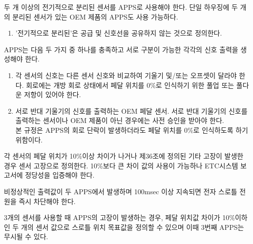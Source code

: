 \documentclass[final,a4paper,10pt]{report}
\begin{document}
\begin{enumerate}
\begin{enumerate}
      \item\label{rule:formula-technical.electronic-throttle-control.apps.two-separated-sensors} 두 개 이상의 전기적으로 분리된 센서를 APPS로 사용해야 한다. 단일 하우징에 두 개의 분리된 센서가 있는 OEM 제품의 APPS도 사용 가능하다.
        \begin{enumerate}
          \item\label{rule:formula-technical.electronic-throttle-control.apps.two-separated-sensors.definition} {\color{blue} '전기적으로 분리된'은 공급 및 신호선을 공유하지 않는 것으로 정의한다.}
        \end{enumerate}

      {\color{blue}
      \item\label{rule:formula-technical.electronic-throttle-control.apps.distinct-signals} APPS는 다음 두 가지 중 하나를 충족하고 서로 구분이 가능한 각각의 신호 출력을 생성해야 한다.
        \begin{enumerate}
          \item\label{rule:formula-technical.electronic-throttle-control.apps.distinct-signals.differing-slope-or-offset} 각 센서의 신호는 다른 센서 신호와 비교하여 기울기 및/또는 오프셋이 달라야 한다. 회로에는 개방 회로 상태에서 페달 위치를 0\%로 인식하기 위한 풀업 또는 풀다운 저항이 있어야 한다.
          \item\label{rule:formula-technical.electronic-throttle-control.apps.distinct-signals.opposite-slope-sensors} 서로 반대 기울기의 신호를 출력하는 OEM 페달 센서. 서로 반대 기울기의 신호를 출력하는 센서이나 OEM 제품이 아닌 경우에는 사전 승인을 받아야 한다. \\
            본 규정은 APPS의 회로 단락이 발생하더라도 페달 위치를 0\%로 인식하도록 하기 위함이다.
        \end{enumerate}

      \item\label{rule:formula-technical.electronic-throttle-control.apps.sensor-failure-10pct-diff} 각 센서의 페달 위치가 10\%이상 차이가 나거나 제36조에 정의된 기타 고장이 발생한 경우 센서 고장으로 정의한다. 10\%보다 큰 차이 값의 사용이 가능하나 ETC시스템 보고서에 정당성을 입증해야 한다.
      \item\label{rule:formula-technical.electronic-throttle-control.apps.shutdown-after-100ms-mismatch} 비정상적인 출력값이 두 APPS에서 발생하며 100msec 이상 지속되면 전자 스로틀 전원을 즉시 차단해야 한다.
      \item\label{rule:formula-technical.electronic-throttle-control.apps.three-sensor-fallback} 3개의 센서를 사용할 때 APPS의 고장이 발생하는 경우, 페달 위치값 차이가 10\%이하인 두 개의 센서 값으로 스로틀 위치 목표값을 정의할 수 있으며 이때 3번째 APPS는 무시될 수 있다.

}
\end{enumerate}
\end{enumerate}
\end{document}
